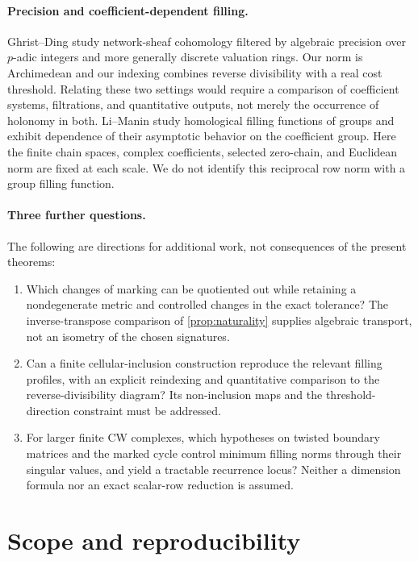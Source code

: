 \documentclass[11pt,a4paper]{article}
\begin{document}
\paragraph{Precision and coefficient-dependent filling.}
Ghrist--Ding \cite{ghrist-ding} study network-sheaf cohomology filtered by
algebraic precision over $p$-adic integers and more generally discrete
valuation rings.  Our norm is Archimedean and our indexing combines
reverse divisibility with a real cost threshold.  Relating these two
settings would require a comparison of coefficient systems, filtrations,
and quantitative outputs, not merely the occurrence of holonomy in both.
Li--Manin \cite{li-manin} study homological filling functions of groups
and exhibit dependence of their asymptotic behavior on the coefficient
group.  Here the finite chain spaces, complex coefficients, selected
zero-chain, and Euclidean norm are fixed at each scale.  We do not
identify this reciprocal row norm with a group filling function.

\paragraph{Three further questions.}
The following are directions for additional work, not consequences of
the present theorems:
\begin{enumerate}
 \item Which changes of marking can be quotiented out while retaining
 a nondegenerate metric and controlled changes in the exact tolerance?
 The inverse-transpose comparison of \cref{prop:naturality} supplies
 algebraic transport, not an isometry of the chosen signatures.
 \item Can a finite cellular-inclusion construction reproduce the
 relevant filling profiles, with an explicit reindexing and quantitative
 comparison to the reverse-divisibility diagram?  Its non-inclusion maps
 and the threshold-direction constraint must be addressed.
 \item For larger finite CW complexes, which hypotheses on twisted
 boundary matrices and the marked cycle control minimum filling norms
 through their singular values, and yield a tractable recurrence locus?
 Neither a dimension formula nor an exact scalar-row reduction is assumed.
\end{enumerate}

\section{Scope and reproducibility}
\end{document}
